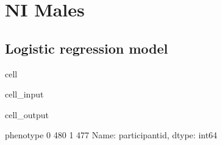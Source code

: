 \documentclass[letterpaper,10pt,english]{jupyterBook}
\begin{document}
\section{NI Males}
\label{\detokenize{Cooper:ni-males}}

\subsection{Logistic regression model}
\label{\detokenize{Cooper:id19}}
\begin{sphinxuseclass}{cell}\begin{sphinxVerbatimInput}

\begin{sphinxuseclass}{cell_input}
\begin{sphinxVerbatim}[commandchars=\\\{\}]
  \PYG{p}{[}    \PYG{p}{]}
  \PYG{p}{[}\PYG{p}{[}\PYG{p}{]}\PYG{p}{]}
  \PYG{p}{[}\PYG{p}{]}
     
\PYG{p}{[}\PYG{p}{]}
\end{sphinxVerbatim}

\end{sphinxuseclass}\end{sphinxVerbatimInput}
\begin{sphinxVerbatimOutput}

\begin{sphinxuseclass}{cell_output}
\begin{sphinxVerbatim}[commandchars=\\\{\}]
phenotype
0    480
1    477
Name: participant\PYGZus{}id, dtype: int64
\end{sphinxVerbatim}

\end{sphinxuseclass}\end{sphinxVerbatimOutput}

\end{sphinxuseclass}
\end{document}

